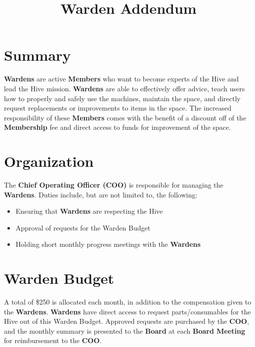 \documentclass[11pt, oneside]{article}   	%
\title{Warden Addendum}
\begin{document}
\maketitle

\section{Summary}
\textbf{Wardens} are active \textbf{Members} who want to become experts of the Hive and lead the Hive mission.
\textbf{Wardens} are able to effectively offer advice, teach users how to properly and safely use the machines, maintain the space, and directly request replacements or improvements to items in the space.
The increased responsibility of these \textbf{Members} comes with the benefit of a discount off of the \textbf{Membership} fee and direct access to funds for improvement of the space.

\section{Organization}
The \textbf{Chief Operating Officer (COO)} is responsible for managing the \textbf{Wardens}. Duties include, but are not limited to, the following:
\begin{itemize}[noitemsep]
\item Ensuring that \textbf{Wardens} are respecting the Hive
\item Approval of requests for the Warden Budget
\item Holding short monthly progress meetings with the \textbf{Wardens}
\end{itemize}

\section{Warden Budget}
A total of \$250 is allocated each month, in addition to the compensation given to the \textbf{Wardens}.
\textbf{Wardens} have direct access to request parts/consumables for the Hive out of this Warden Budget.
Approved requests are purchased by the \textbf{COO}, and the monthly summary is presented to the \textbf{Board} at each \textbf{Board Meeting} for reimbursement to the \textbf{COO}.
\end{document}
